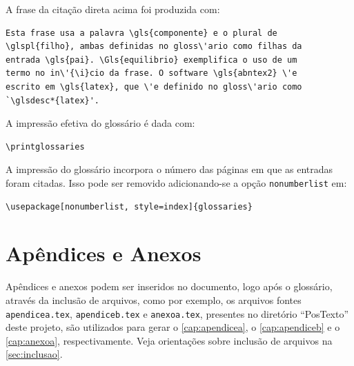 A frase da cita\c{c}\~ao direta acima foi produzida com:

\begin{SingleSpacing}%
\begin{verbatim}
Esta frase usa a palavra \gls{componente} e o plural de
\glspl{filho}, ambas definidas no gloss\'ario como filhas da
entrada \gls{pai}. \Gls{equilibrio} exemplifica o uso de um
termo no in\'{\i}cio da frase. O software \gls{abntex2} \'e
escrito em \gls{latex}, que \'e definido no gloss\'ario como
`\glsdesc*{latex}'.
\end{verbatim}
\end{SingleSpacing}

A impress\~ao efetiva do gloss\'ario \'e dada com:

\begin{SingleSpacing}%
\begin{verbatim}
\printglossaries
\end{verbatim}
\end{SingleSpacing}

A impress\~ao do gloss\'ario incorpora o n\'umero das p\'aginas em que as entradas foram citadas. Isso pode ser removido adicionando-se a op\c{c}\~ao \texttt{nonumberlist} em:

\begin{SingleSpacing}%
\begin{verbatim}
\usepackage[nonumberlist, style=index]{glossaries}
\end{verbatim}
\end{SingleSpacing}

\section{Ap\^endices e Anexos}\label{sec:apendiceseanexos}

Ap\^endices e anexos podem ser inseridos no documento, logo ap\'os o gloss\'ario, atrav\'es da inclus\~ao de arquivos, como por exemplo, os arquivos fontes \texttt{apendicea.tex}, \texttt{apendiceb.tex} e  \texttt{anexoa.tex}, presentes no diret\'orio ``PosTexto'' deste projeto, s\~ao utilizados para gerar o \autoref{cap:apendicea}, o \autoref{cap:apendiceb} e o \autoref{cap:anexoa}, respectivamente. Veja orienta\c{c}\~oes sobre inclus\~ao de arquivos na \autoref{sec:inclusao}.

